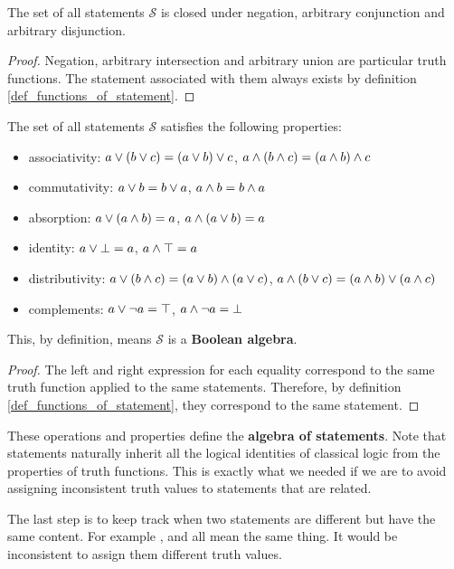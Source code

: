 \documentclass[11pt,letterpaper,fleqn]{memoir} %
\begin{document}
\begin{mathSection}
	\begin{prop}
		The set of all statements $\mathcal{S}$ is closed under negation, arbitrary conjunction and arbitrary disjunction.
	\end{prop}
	\begin{proof}
		Negation, arbitrary intersection and arbitrary union are particular truth functions. The statement associated with them always exists by definition  \eqref{def_functions_of_statement}.
	\end{proof}
	\begin{prop}\label{boolean_properties}
		The set of all statements $\mathcal{S}$ satisfies the following properties:
		\begin{itemize}
			\item associativity: $a \vee (b \vee c) = (a \vee b) \vee c$, $a \wedge (b \wedge c) = (a \wedge b) \wedge c$
			\item commutativity: $a \vee b = b \vee a$, $a \wedge b = b \wedge a$
			\item absorption: $a \vee (a \wedge b) = a$, $a \wedge (a \vee b) = a$
			\item identity: $a \vee \bot = a
			$, $a \wedge \top = a$
			\item distributivity: $a \vee (b \wedge c) = (a \vee b) \wedge (a \vee c)$, $a \wedge (b \vee c) = (a \wedge b) \vee (a \wedge c)$
			\item complements: $a \vee \neg a = \top$, $a \wedge \neg a = \bot$
		\end{itemize}
		This, by definition, means $\mathcal{S}$ is a \textbf{Boolean algebra}.
	\end{prop}
	\begin{proof}
		The left and right expression for each equality correspond to the same truth function applied to the same statements. Therefore, by definition  \eqref{def_functions_of_statement}, they correspond to the same statement.
	\end{proof}
\end{mathSection}

These operations and properties define the \textbf{algebra of statements}. Note that statements naturally inherit all the logical identities of classical logic from the properties of truth functions. This is exactly what we needed if we are to avoid assigning inconsistent truth values to statements that are related. 

The last step is to keep track when two statements are different but have the same content. For example ,  and  all mean the same thing. It would be inconsistent to assign them different truth values.
\end{document}
